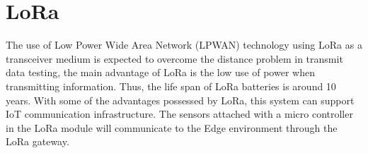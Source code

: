 \documentclass[a4paper]{article}
\begin{document}
\section{LoRa}

The use of Low Power Wide Area Network (LPWAN) technology using LoRa as a transceiver medium is expected to overcome the distance problem in transmit data testing,
	the main advantage of LoRa is the low use of power when transmitting information.
Thus,
	the life span of LoRa batteries is around 10 years.
With some of the advantages possessed by LoRa,
	this system can support IoT communication infrastructure.
The sensors attached with a micro controller in the LoRa module will communicate to the Edge environment through the LoRa gateway.




\printbibliography



\end{document}
